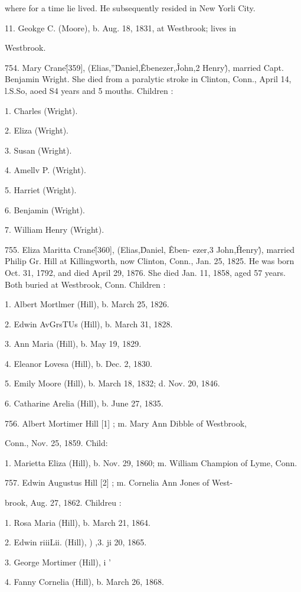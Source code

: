 \documentclass{book}
\begin{document}
where for a time lie lived. He subsequently resided in New 
Yorli City. 

11. Geokge C. (Moore), b. Aug. 18, 1831, at Westbrook; lives in 

Westbrook. 

754. Mary Crane\^ [359], (Elias,''\^ Daniel,\^ Ebenezer,\^ John,2 
Henry\^), married Capt. Benjamin Wright. She died from a 
paralytic stroke in Clinton, Conn., April 14, l.S.So, aoed S4 years 
and 5 mouths. Children : 

1. Charles (Wright). 

2. Eliza (Wright). 

3. Susan (Wright). 

4. Amellv P. (Wright). 

5. Harriet (Wright). 

6. Benjamin (Wright). 

7. William Henry (Wright). 

755. Eliza Maritta Crane\^ [360], (Elias,\^ Daniel, \^ Eben- 
ezer,3 John,\^ Henry\^), married Philip Gr. Hill at Killingworth, 
now Clinton, Conn., Jan. 25, 1825. He was born Oct. 31, 1792, 
and died April 29, 1876. She died Jan. 11, 1858, aged 57 years. 
Both buried at Westbrook, Conn. Children : 

1. Albert Mortlmer (Hill), b. March 25, 1826. 

2. Edwin AvGrsTUs (Hill), b. March 31, 1828. 

3. Ann Maria (Hill), b. May 19, 1829. 

4. Eleanor Lovesa (Hill), b. Dec. 2, 1830. 

5. Emily Moore (Hill), b. March 18, 1832; d. Nov. 20, 1846. 

6. Catharine Arelia (Hill), b. June 27, 1835. 

756. Albert Mortimer Hill [1] ; m. Mary Ann Dibble of Westbrook, 

Conn., Nov. 25, 1859. Child: 

1. Marietta Eliza (Hill), b. Nov. 29, 1860; m. William 
Champion of Lyme, Conn. 

757. Edwin Augustus Hill [2] ; m. Cornelia Ann Jones of West- 

brook, Aug. 27, 1862. Childreu : 

1. Rosa Maria (Hill), b. March 21, 1864. 

2. Edwin riiiLii. (Hill), ) ,3. ji 20, 1865. 

3. George Mortimer (Hill), i ' 

4. Fanny Cornelia (Hill), b. March 26, 1868. 
\end{document}
